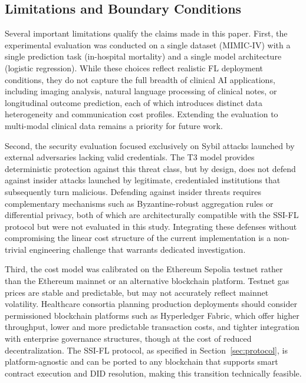 \documentclass{sbc2023}
\begin{document}
\subsection{Limitations and Boundary Conditions}

Several important limitations qualify the claims made in this paper. First, the experimental evaluation was conducted on a single dataset (MIMIC-IV) with a single prediction task (in-hospital mortality) and a single model architecture (logistic regression). While these choices reflect realistic FL deployment conditions, they do not capture the full breadth of clinical AI applications, including imaging analysis, natural language processing of clinical notes, or longitudinal outcome prediction, each of which introduces distinct data heterogeneity and communication cost profiles. Extending the evaluation to multi-modal clinical data remains a priority for future work.

Second, the security evaluation focused exclusively on Sybil attacks launched by external adversaries lacking valid credentials. The T3 model provides deterministic protection against this threat class, but by design, does not defend against insider attacks launched by legitimate, credentialed institutions that subsequently turn malicious. Defending against insider threats requires complementary mechanisms such as Byzantine-robust aggregation rules or differential privacy, both of which are architecturally compatible with the SSI-FL protocol but were not evaluated in this study. Integrating these defenses without compromising the linear cost structure of the current implementation is a non-trivial engineering challenge that warrants dedicated investigation.

Third, the cost model was calibrated on the Ethereum Sepolia testnet rather than the Ethereum mainnet or an alternative blockchain platform. Testnet gas prices are stable and predictable, but may not accurately reflect mainnet volatility. Healthcare consortia planning production deployments should consider permissioned blockchain platforms such as Hyperledger Fabric, which offer higher throughput, lower and more predictable transaction costs, and tighter integration with enterprise governance structures, though at the cost of reduced decentralization. The SSI-FL protocol, as specified in Section~\ref{sec:protocol}, is platform-agnostic and can be ported to any blockchain that supports smart contract execution and DID resolution, making this transition technically feasible.
\end{document}
